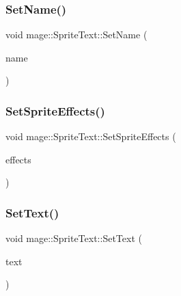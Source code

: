 \hypertarget{classmage_1_1_sprite_text_a48324e6a5f896b11701ad5b0f8ab3ad1}{}\label{classmage_1_1_sprite_text_a48324e6a5f896b11701ad5b0f8ab3ad1} 
\subsubsection{\texorpdfstring{Set\+Name()}{SetName()}}
{\footnotesize\ttfamily void mage\+::\+Sprite\+Text\+::\+Set\+Name (\begin{DoxyParamCaption}\item[{const string \&}]{name }\end{DoxyParamCaption})}

\hypertarget{classmage_1_1_sprite_text_aedce1cc8bca6f038b618044ddfadcf6a}{}\label{classmage_1_1_sprite_text_aedce1cc8bca6f038b618044ddfadcf6a} 
\subsubsection{\texorpdfstring{Set\+Sprite\+Effects()}{SetSpriteEffects()}}
{\footnotesize\ttfamily void mage\+::\+Sprite\+Text\+::\+Set\+Sprite\+Effects (\begin{DoxyParamCaption}\item[{\hyperlink{namespacemage_a9cfe18123066ba4236f548f9de75d881}{Sprite\+Effect}}]{effects }\end{DoxyParamCaption})}

\hypertarget{classmage_1_1_sprite_text_ac33e512ab29554a306ada9a378ab00eb}{}\label{classmage_1_1_sprite_text_ac33e512ab29554a306ada9a378ab00eb} 
\subsubsection{\texorpdfstring{Set\+Text()}{SetText()}\hspace{0.1cm}{\footnotesize\ttfamily [1/3]}}
{\footnotesize\ttfamily void mage\+::\+Sprite\+Text\+::\+Set\+Text (\begin{DoxyParamCaption}\item[{const wstring \&}]{text }\end{DoxyParamCaption})}

